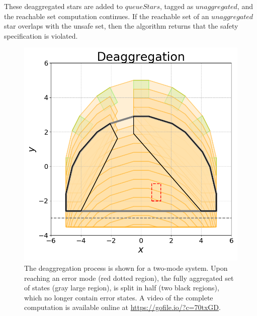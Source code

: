 These deaggregated stars are added to $queueStars$, tagged as $unaggregated$, and the reachable set computation continues. 
%
If the reachable set of an $unaggregated$ star overlaps with the unsafe set, then the algorithm returns that the safety specification is violated.

\vspace{-0.4cm}
\begin{figure}[h!]
\centerline{\includegraphics[width=0.7\columnwidth]{images/deagg.png}}
\vspace{-0.4cm}
\caption{The deaggregation process is shown for a two-mode system. Upon reaching an error mode (red dotted region), the fully aggregated set of states (gray large region), is split in half (two black regions), which no longer contain error states. A video of the complete computation is available online at \url{https://gofile.io/?c=70txGD}.}
\end{figure}
\vspace{-0.4cm}


